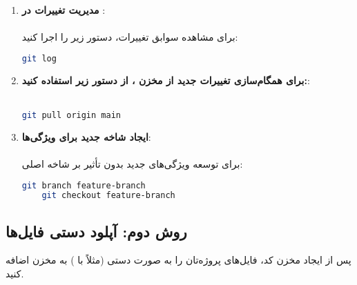 \begin{enumerate}
     \item \textbf{مدیریت تغییرات در }:\\\\
     برای مشاهده سوابق تغییرات، دستور زیر را اجرا کنید:
     \begin{terminal}
    \begin{lstlisting}[language=bash]
    git log
    \end{lstlisting}
    \end{terminal} 

    \item \textbf{برای همگام‌سازی تغییرات جدید از مخزن ، از دستور زیر استفاده کنید:}:\\\\
    \begin{terminal}
    \begin{lstlisting}[language=bash]
    git pull origin main
    \end{lstlisting}
    \end{terminal} 

    \item \textbf{ایجاد شاخه جدید برای ویژگی‌ها}:\\\\
    برای توسعه ویژگی‌های جدید بدون تأثیر بر شاخه اصلی:
    \begin{terminal}
    \begin{lstlisting}[language=bash]
    git branch feature-branch
    git checkout feature-branch
    \end{lstlisting}
    \end{terminal} 
    
    
\end{enumerate}


\subsection{روش دوم: آپلود دستی فایل‌ها}

پس از ایجاد مخزن کد، فایل‌های پروژه‌تان را به صورت دستی (مثلاً با ) به مخزن اضافه کنید.